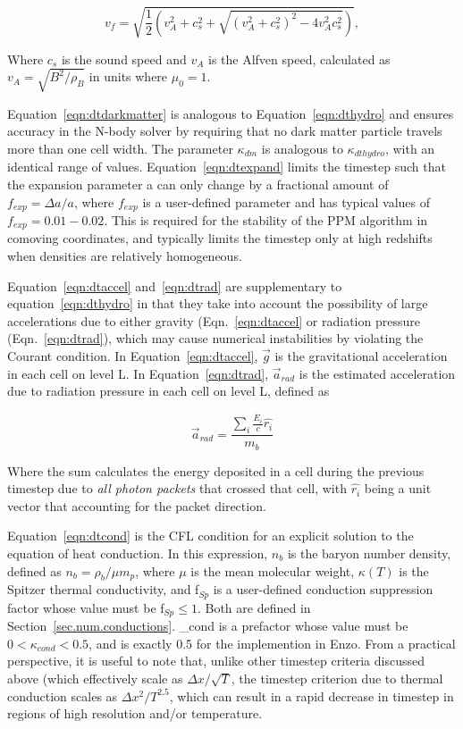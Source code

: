 \begin{equation}
v_f = \sqrt{ \frac{1}{2} \left(  v_A^2 + c_s^2 + \sqrt{(v_A^2 +
      c_s^2)^2 - 4 v_A^2 c_s^2}  \right)  },
\label{eqn:vfastmhd}
\end{equation}

Where $c_s$ is the sound speed and $v_A$ is the Alfven speed, calculated
as $v_A = \sqrt{B^2/\rho_B}$ in units where $\mu_0 = 1$.

Equation~\ref{eqn:dtdarkmatter} is analogous to
Equation~\ref{eqn:dthydro} and ensures accuracy in the N-body solver
by requiring that no dark matter particle travels more than one cell
width.  The parameter $\kappa_{dm}$ is analogous to
$\kappa_{dthydro}$, with an identical range of values.
Equation~\ref{eqn:dtexpand} limits the timestep such that the
expansion parameter a can only change by a fractional amount of
$f_{exp} = \Delta a/a$, where $f_{exp}$ is a user-defined parameter
and has typical values of $f_{exp} = 0.01-0.02$.  This is required for
the stability of the PPM algorithm in comoving coordinates, and
typically limits the timestep only at high redshifts when densities
are relatively homogeneous.

Equation~\ref{eqn:dtaccel} and~\ref{eqn:dtrad} are supplementary to equation~\ref{eqn:dthydro} in that they
take into account the possibility of large accelerations due to either
gravity (Eqn.~\ref{eqn:dtaccel} or radiation pressure
(Eqn.~\ref{eqn:dtrad}), which may cause numerical 
instabilities by violating the Courant condition.  In Equation~\ref{eqn:dtaccel}, $\vec{g}$ is the
gravitational acceleration in each cell on level L.  In
Equation~\ref{eqn:dtrad}, $\vec{a}_{rad}$ is the estimated
acceleration due to radiation pressure in each cell on level L,
defined as

\begin{equation}
\vec{a}_{rad} = \frac{ \sum_i \frac{\dot{E_i}}{c} \hat{r_i} }{m_b} 
\end{equation}

Where the sum calculates the energy deposited in a cell during the
previous timestep due to \textit{all photon packets} that crossed that
cell, with $\hat{r_i}$ being a unit vector that accounting for the
packet direction.

Equation~\ref{eqn:dtcond} is the CFL condition for an explicit
solution to the equation of heat conduction.  In this expression,
$n_b$ is the baryon number density, defined as $n_b = \rho_b / \mu
m_p$, where $\mu$ is the mean molecular weight, $\kappa(T)$ is the
Spitzer thermal conductivity, and f$_{Sp}$ is a user-defined
conduction suppression factor whose value must be f$_{Sp} \leq 1$.  Both are defined in
Section~\ref{sec.num.conductions}.  \kappa_{cond} is a prefactor whose
value must be $0 < \kappa_{cond}  < 0.5$, and is exactly 0.5 for the
implemention in Enzo.
From a practical
perspective, it is useful to note that, unlike other timestep criteria
discussed above (which effectively scale as $\Delta x / \sqrt{T}$,
the timestep criterion due to thermal conduction scales as $\Delta x^2
/ T^{2.5}$, which can result in a rapid decrease in timestep in
regions of high resolution and/or temperature.

